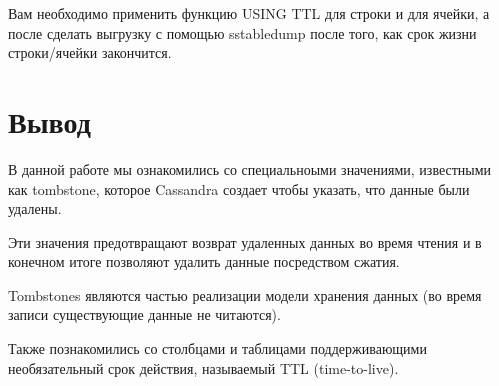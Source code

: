 Вам необходимо применить функцию USING TTL для строки и для
ячейки, а после сделать выгрузку с помощью sstabledump после того, как срок
жизни строки/ячейки закончится.

\clearpage

\section*{\LARGE Вывод}
В данной работе мы ознакомились со специальноыми значениями,
известными как tombstone, которое Cassandra создает чтобы указать,
что данные были удалены.\par
Эти значения предотвращают возврат удаленных данных во время чтения
и в конечном итоге позволяют удалить данные посредством сжатия.\par
Tombstones являются частью реализации модели хранения данных (во
время записи существующие данные не читаются).\par
Также познакомились со столбцами и таблицами поддерживающими
необязательный срок действия, называемый TTL (time-to-live).

